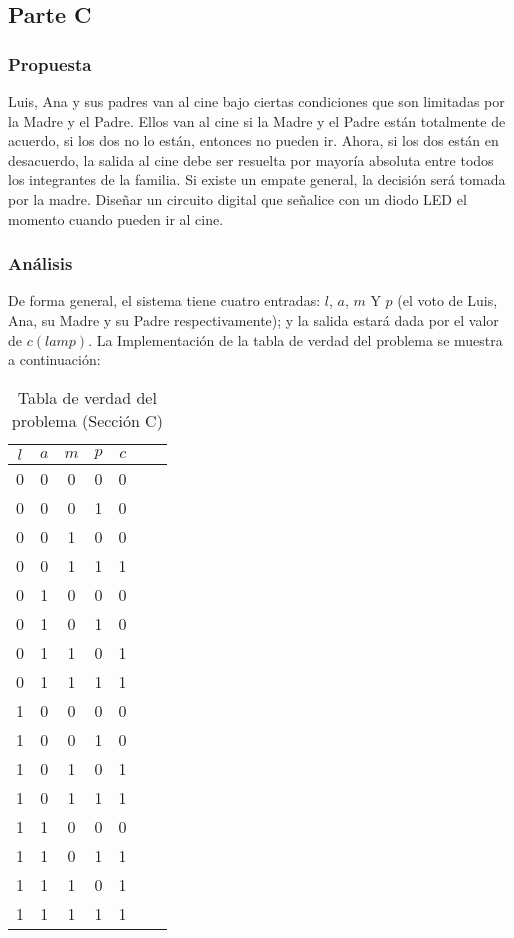 \documentclass[../procedimientos.tex]{subfiles}
\begin{document}
\clearpage
\subsection{Parte C}
\subsubsection{Propuesta}
Luis, Ana y sus padres van al cine bajo ciertas condiciones que son limitadas 
por la Madre y el Padre. Ellos van al cine si la Madre y el Padre están 
totalmente de acuerdo, si los dos no lo están, entonces no pueden ir. Ahora, 
si los dos están en desacuerdo, la salida al cine debe ser resuelta por 
mayoría absoluta entre todos los integrantes de la familia. Si existe un 
empate general, la decisión será tomada por la madre. Diseñar un circuito 
digital que señalice con un diodo LED el momento cuando pueden ir al cine.

\subsubsection{Análisis}
De forma general, el sistema tiene cuatro entradas: $l$, $a$, $m$ Y $p$ (el 
voto de Luis, Ana, su Madre y su Padre respectivamente); y la salida estará 
dada por el valor de $c(lamp)$.  La Implementación de la tabla de verdad del 
problema se muestra a continuación:
\begin{table}[H]
  \centering
  \begin{tabular}{cccc|ccc}
    \hline
    $l$ & $a$ & $m$ & $p$ & $c$\\
    \hline
    0 & 0 & 0 & 0 & 0\\
    0 & 0 & 0 & 1 & 0\\
    0 & 0 & 1 & 0 & 0\\
    0 & 0 & 1 & 1 & 1\\
    0 & 1 & 0 & 0 & 0\\
    0 & 1 & 0 & 1 & 0\\
    0 & 1 & 1 & 0 & 1\\
    0 & 1 & 1 & 1 & 1\\
    1 & 0 & 0 & 0 & 0\\
    1 & 0 & 0 & 1 & 0\\
    1 & 0 & 1 & 0 & 1\\
    1 & 0 & 1 & 1 & 1\\
    1 & 1 & 0 & 0 & 0\\
    1 & 1 & 0 & 1 & 1\\
    1 & 1 & 1 & 0 & 1\\
    1 & 1 & 1 & 1 & 1\\
    \hline
  \end{tabular}
  \caption{Tabla de verdad del problema (Sección C)}
  \label{tab:tv_c}
\end{table}
\end{document}

